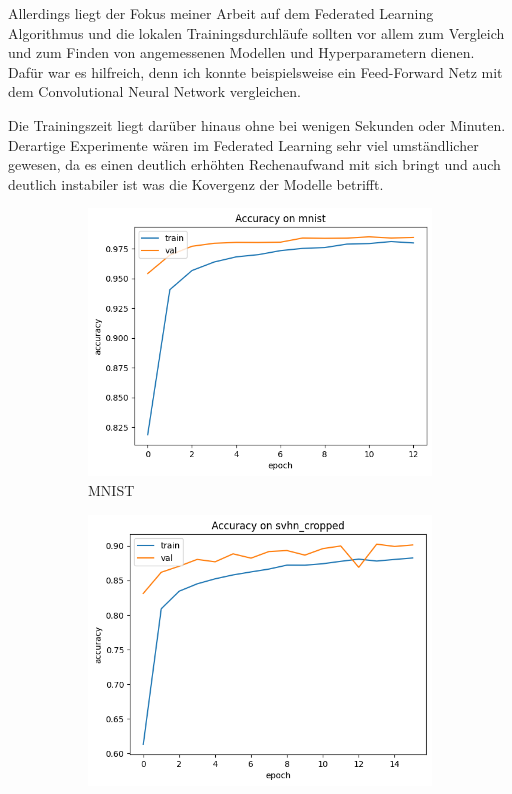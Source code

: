 Allerdings liegt der Fokus meiner Arbeit auf dem Federated Learning Algorithmus und die lokalen Trainingsdurchläufe sollten vor allem zum Vergleich und zum Finden von angemessenen Modellen und Hyperparametern dienen. Dafür war es hilfreich, denn ich konnte beispielsweise ein Feed-Forward Netz mit dem Convolutional Neural Network vergleichen. 

Die Trainingszeit liegt darüber hinaus ohne bei wenigen Sekunden oder Minuten. Derartige Experimente wären im Federated Learning sehr viel umständlicher gewesen, da es einen deutlich erhöhten Rechenaufwand mit sich bringt und auch deutlich instabiler ist was die Kovergenz der Modelle betrifft.

\begin{figure}
	\centering
	\begin{subfigure}{0.3\textwidth}
		\centering
		\includegraphics[width=\textwidth]{Bilder/mnist-results-local.png}
		\caption{MNIST}
	\end{subfigure}
	\begin{subfigure}{0.3\textwidth}
		\centering
		\includegraphics[width=\textwidth]{Bilder/svhn-results-local.png}

\end{subfigure}
\end{figure}
